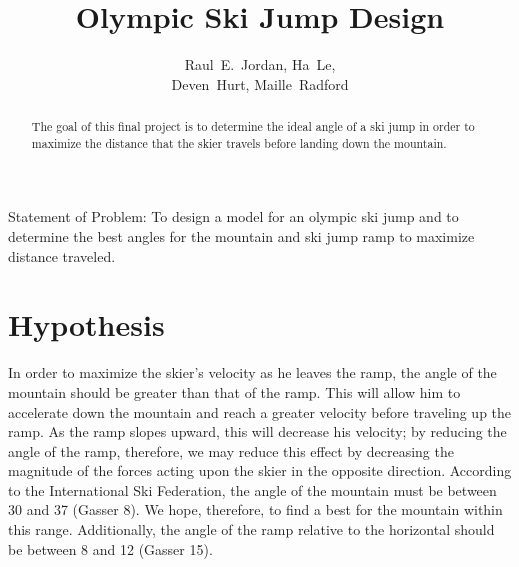 \documentclass[]{IEEEphot}
\begin{document}
\title{Olympic Ski Jump Design}

\author{Raul~E.~Jordan, Ha~Le,
\\
Deven~Hurt, Maille~Radford}


%

\maketitle


\begin{receivedinfo}
\begin{center}
Statement of Problem: To design a model for an olympic ski jump and to determine the best angles for the mountain and ski jump ramp to maximize distance traveled.
\end{center}
\end{receivedinfo}

\begin{abstract}
 The goal of this final project is to determine the ideal angle of a ski jump in order to maximize the distance that the skier travels before landing down the mountain.

\end{abstract}

\section{Hypothesis}
 In order to maximize the skier’s velocity as he leaves the ramp, the angle of the mountain should be greater than that of the ramp. This will allow him to accelerate down the mountain and reach a greater velocity before traveling up the ramp. As the ramp slopes upward, this will decrease his velocity; by reducing the angle of the ramp, therefore, we may reduce this effect by decreasing the magnitude of the forces acting upon the skier in the opposite direction. According to the International Ski Federation, the angle of the mountain must be between 30 and 37 (Gasser 8). We hope, therefore, to find a best  for the mountain within this range. Additionally, the angle of the ramp relative to the horizontal should be between 8 and 12 (Gasser 15).
\end{document}
